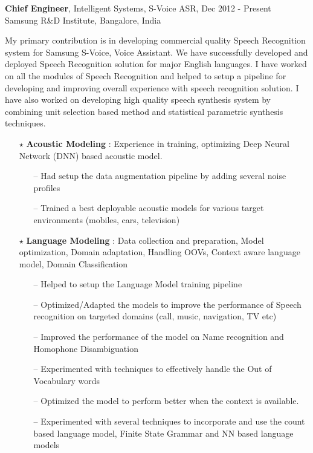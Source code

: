 \documentclass[line,margin]{res}
\begin{document}
\begin{resume}
\normalsize
 {\bf Chief Engineer}, Intelligent Systems, S-Voice ASR, \hfill Dec 2012 - Present\\
 \hfill Samsung R\&D Institute, Bangalore, India
\small

My primary contribution is in developing commercial quality Speech Recognition system for Samsung S-Voice, Voice Assistant. We have successfully developed and deployed Speech Recognition solution for major English languages. I have worked on all the modules of Speech Recognition and helped to setup a pipeline for developing and improving overall experience with speech recognition solution. I have also worked on developing high quality speech synthesis system by combining unit selection based method and statistical parametric synthesis techniques.

\begin{itemize} \itemsep -1pt  %
\small
	\item[$\star$] {\bf Acoustic Modeling}   : Experience in training, optimizing Deep Neural Network (DNN) based acoustic model.
	\begin{itemize}	\small	
		\item[--] Had setup the data augmentation pipeline by adding several noise profiles
		\item[--] Trained a best deployable acoustic models for various target environments (mobiles, cars, television)
	\end{itemize}
	\item[$\star$] {\bf Language Modeling}   : Data collection and preparation, Model optimization, Domain adaptation, Handling OOVs, Context aware language model, Domain Classification
	\begin{itemize}	\small	
		\item[--] Helped to setup the Language Model training pipeline
		\item[--] Optimized/Adapted the models to improve the performance of Speech recognition on targeted domains (call, music, navigation, TV etc)
		\item[--] Improved the performance of the model on Name recognition and Homophone Disambiguation
		\item[--] Experimented with techniques to effectively handle the Out of Vocabulary words
		\item[--] Optimized the model to perform better when the context is available.
		\item[--] Experimented with several techniques to incorporate and use the count based language model, Finite State Grammar and NN based language models
	\end{itemize}


\end{itemize}
\end{resume}
\end{document}

